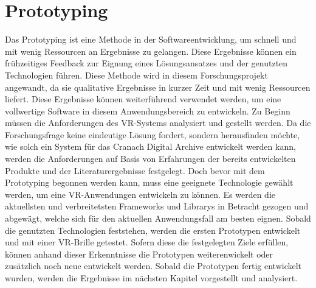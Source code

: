\documentclass[a4paper,12pt,oneside]{article}
\begin{document}
  \section{Prototyping}
    Das Prototyping ist eine Methode in der Softwareentwicklung, um schnell und mit 
    wenig Ressourcen an Ergebnisse zu gelangen. Diese Ergebnisse können ein frühzeitiges
    Feedback zur Eignung eines Lösungsansatzes und der genutzten Technologien führen.
    Diese Methode wird in diesem Forschungsprojekt angewandt, da sie qualitative Ergebnisse
    in kurzer Zeit und mit wenig Ressourcen liefert. Diese Ergebnisse können weiterführend
    verwendet werden, um eine vollwertige Software in diesem Anwendungsbereich zu 
    entwickeln.
    Zu Beginn müssen die Anforderungen des VR-Systems analysiert und gestellt werden. Da
    die Forschungsfrage keine eindeutige Lösung fordert, sondern herausfinden möchte,
    wie solch ein System für das Cranach Digital Archive entwickelt werden kann, werden
    die Anforderungen auf Basis von Erfahrungen der bereits entwickelten Produkte und der 
    Literaturergebnisse festgelegt.
    Doch bevor mit dem Prototyping begonnen werden kann, muss eine geeignete Technologie
    gewählt werden, um eine VR-Anwendungen entwickeln zu können. Es werden die aktuellsten
    und verbreitetsten Frameworks und Librarys in Betracht gezogen und abgewägt, welche
    sich für den aktuellen Anwendungsfall am besten eignen.
    Sobald die genutzten Technologien feststehen, werden die ersten Prototypen entwickelt
    und mit einer VR-Brille getestet. Sofern diese die festgelegten Ziele erfüllen, können
    anhand dieser Erkenntnisse die Prototypen weiterenwickelt oder zusätzlich noch neue 
    entwickelt werden.
    Sobald die Prototypen fertig entwickelt wurden, werden die Ergebnisse im 
    nächsten Kapitel vorgestellt und analysiert.
\end{document}
